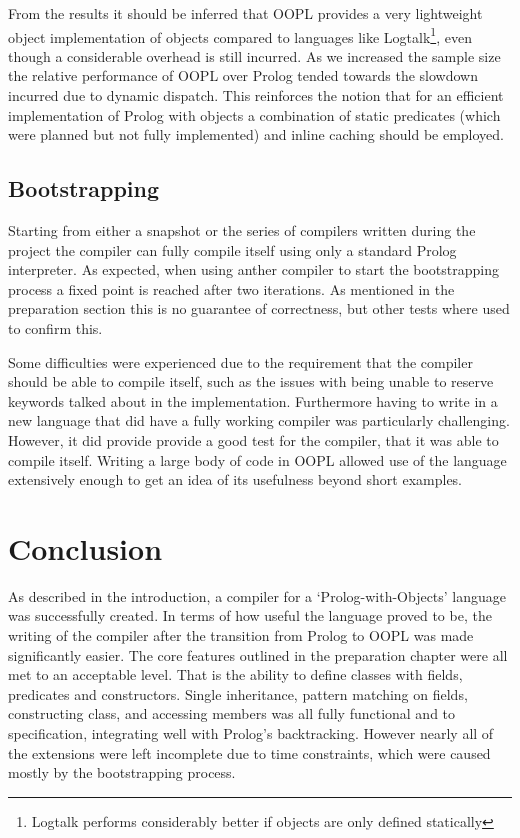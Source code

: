 \documentclass[12pt,a4paper,twoside,openright]{report}
\begin{document}
\bigskip

From the results it should be inferred that OOPL provides a very lightweight object implementation of objects compared to languages like Logtalk\footnote{Logtalk performs considerably better if objects are only defined statically}, even though a considerable overhead is still incurred. As we increased the sample size the relative performance of OOPL over Prolog tended towards the slowdown incurred due to dynamic dispatch. This reinforces the notion that for an efficient implementation of Prolog with objects a combination of static predicates (which were planned but not fully implemented) and inline caching should be employed.

\section{Bootstrapping}

Starting from either a snapshot or the series of compilers written during the project the compiler can fully compile itself using only a standard Prolog interpreter. As expected, when using anther compiler to start the bootstrapping process a fixed point is reached after two iterations. As mentioned in the preparation section this is no guarantee of correctness, but other tests where used to confirm this.

\bigskip

Some difficulties were experienced due to the requirement that the compiler should be able to compile itself, such as the issues with being unable to reserve keywords talked about in the implementation. Furthermore having to write in a new language that did have a fully working compiler was particularly challenging. However, it did provide provide a good test for the compiler, that it was able to compile itself. Writing a large body of code in OOPL allowed use of the language extensively enough to get an idea of its usefulness beyond short examples.

\chapter{Conclusion}

As described in the introduction, a compiler for a `Prolog-with-Objects' language was successfully created. In terms of how useful the language proved to be, the writing of the compiler after the transition from Prolog to OOPL was made significantly easier. The core features outlined in the preparation chapter were all met to an acceptable level. That is the ability to define classes with fields, predicates and constructors. Single inheritance, pattern matching on fields, constructing class, and accessing members was all fully functional and to specification, integrating well with Prolog's backtracking. However nearly all of the extensions were left incomplete due to time constraints, which were caused mostly by the bootstrapping process.
\end{document}

